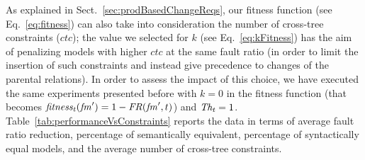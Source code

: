 \begin{tikzborder}{\cite{Gargantini16:validation}}
\begin{tikzborder}{\cite{gargantini_combinatorial_2017}}
\begin{tikzborder}{\cite{gargantini_combinatorial_2017}}
\begin{tikzborder}{\cite{garn2019}}
\begin{tikzborder}{\cite{arcaini2019achieving}}
	
	
	As explained in Sect.~\ref{sec:prodBasedChangeReqs}, our fitness function (see Eq.~\ref{eq:fitness}) can also take into consideration the number of cross-tree constraints ($\mathit{ctc}$); the value we selected for $k$ (see Eq.~\ref{eq:kFitness}) has the aim of penalizing models with higher $\mathit{ctc}$ at the same fault ratio (in order to limit the insertion of such constraints and instead give precedence to changes of the parental relations). In order to assess the impact of this choice, we have executed the same experiments presented before with $k=0$ in the fitness function (that becomes $\mathit{fitness_t}(\mathit{fm}^\prime) = 1 - \mathit{FR}(\mathit{fm}^\prime, t)$) and $\mathit{Th_t}=1$. Table~\ref{tab:performanceVsConstraints} reports the data in terms of average fault ratio reduction, percentage of semantically equivalent, percentage of syntactically equal models, and the average number of cross-tree constraints.
	\be
	

\end{tikzborder}
\end{tikzborder}
\end{tikzborder}
\end{tikzborder}
\end{tikzborder}

